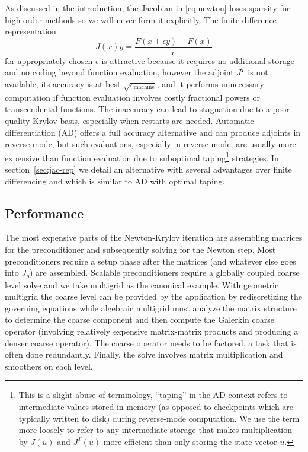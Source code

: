 As discussed in the introduction, the Jacobian in \eqref{eq:newton} loses sparsity for high order methods so we will
never form it explicitly.  The finite difference representation
\begin{equation*}
J(x) y = \frac{F(x+\epsilon y) - F(x)}{\epsilon}
\end{equation*}
for appropriately chosen $\epsilon$ is attractive because it requires no additional storage and no coding beyond
function evaluation, however the adjoint $J^T$ is not available, its accuracy is at best
$\sqrt{\epsilon_{\text{machine}}}$, and it performs unnecessary computation if function evaluation involves costly
fractional powers or transcendental functions.  The inaccuracy can lead to stagnation due to a poor quality Krylov
basis, especially when restarts are needed.  Automatic differentiation (AD) offers a full accuracy alternative and can
produce adjoints in reverse mode, but such evaluations, especially in reverse mode, are usually more expensive than
function evaluation due to suboptimal taping\footnote{This is a slight abuse of terminology, ``taping'' in the AD
  context refers to intermediate values stored in memory (as opposed to checkpoints which are typically written to disk)
  during reverse-mode computation.  We use the term more loosely to refer to any intermediate storage that makes
  multiplication by $J(u)$ and $J^T(u)$ more efficient than only storing the state vector $u$.} strategies.  In
section~\ref{sec:jac-rep} we detail an alternative with several advantages over finite differencing and which is similar
to AD with optimal taping.

\subsection{Performance}\label{sec:jfnk:bottlenecks}
The most expensive parts of the Newton-Krylov iteration are assembling matrices for the preconditioner and subsequently
solving for the Newton step.  Most preconditioners require a setup phase after the matrices (and whatever else goes into
$J_p$) are assembled.  Scalable preconditioners require a globally coupled coarse level solve and we take multigrid as
the canonical example.  With geometric multigrid the coarse level can be provided by the application by rediscretizing
the governing equations while algebraic multigrid must analyze the matrix structure to determine the coarse component
and then compute the Galerkin coarse operator (involving relatively expensive matrix-matrix products and producing a
denser coarse operator).  The coarse operator needs to be factored, a task that is often done redundantly.  Finally, the
solve involves matrix multiplication and smoothers on each level.

